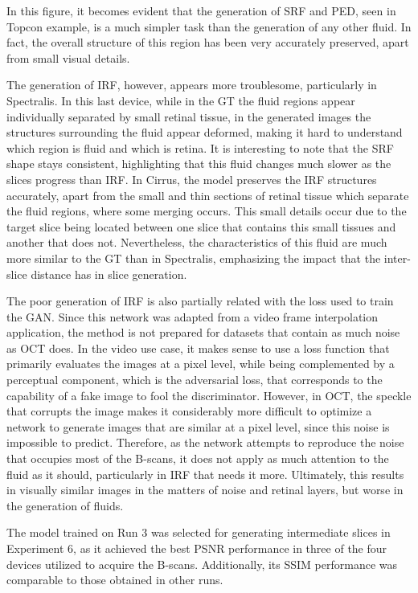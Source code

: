 In this figure, it becomes evident that the generation of SRF and PED, seen in Topcon example, is a much simpler task than the generation of any other fluid. In fact, the overall structure of this region has been very accurately preserved, apart from small visual details.
\par
The generation of IRF, however, appears more troublesome, particularly in Spectralis. In this last device, while in the GT the fluid regions appear individually separated by small retinal tissue, in the generated images the structures surrounding the fluid appear deformed, making it hard to understand which region is fluid and which is retina. It is interesting to note that the SRF shape stays consistent, highlighting that this fluid changes much slower as the slices progress than IRF. In Cirrus, the model preserves the IRF structures accurately, apart from the small and thin sections of retinal tissue which separate the fluid regions, where some merging occurs. This small details occur due to the target slice being located between one slice that contains this small tissues and another that does not. Nevertheless, the characteristics of this fluid are much more similar to the GT than in Spectralis, emphasizing the impact that the inter-slice distance has in slice generation.
\par
The poor generation of IRF is also partially related with the loss used to train the GAN. Since this network was adapted from a video frame interpolation application, the method is not prepared for datasets that contain as much noise as OCT does. In the video use case, it makes sense to use a loss function that primarily evaluates the images at a pixel level, while being complemented by a perceptual component, which is the adversarial loss, that corresponds to the capability of a fake image to fool the discriminator. However, in OCT, the speckle that corrupts the image makes it considerably more difficult to optimize a network to generate images that are similar at a pixel level, since this noise is impossible to predict. Therefore, as the network attempts to reproduce the noise that occupies most of the B-scans, it does not apply as much attention to the fluid as it should, particularly in IRF that needs it more. Ultimately, this results in visually similar images in the matters of noise and retinal layers, but worse in the generation of fluids.
\par
The model trained on Run 3 was selected for generating intermediate slices in Experiment 6, as it achieved the best PSNR performance in three of the four devices utilized to acquire the B-scans. Additionally, its SSIM performance was comparable to those obtained in other runs.

